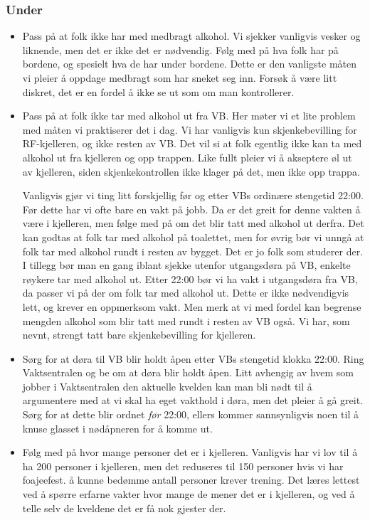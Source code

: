 \documentclass[11pt,norsk,a4paper]{article}
\begin{document}
\subsubsection{Under}
\begin{itemize}
\item Pass på at folk ikke har med medbragt alkohol. Vi sjekker vanligvis vesker og liknende, men det er ikke det er nødvendig. Følg med på hva folk har på bordene, og spesielt hva de har under bordene. Dette er den vanligste måten vi pleier å oppdage medbragt som har sneket seg inn. Forsøk å være litt diskret, det er en fordel å ikke se ut som om man kontrollerer.
\item Pass på at folk ikke tar med alkohol ut fra VB. Her møter vi et lite problem med måten vi praktiserer det i dag. Vi har vanligvis kun skjenkebevilling for RF-kjelleren, og ikke resten av VB. Det vil si at folk egentlig ikke kan ta med alkohol ut fra kjelleren og opp trappen. Like fullt pleier vi å akseptere øl ut av kjelleren, siden skjenkekontrollen ikke klager på det, men ikke opp trappa.

Vanligvis gjør vi ting litt forskjellig før og etter VBs ordinære stengetid 22:00. Før dette har vi ofte bare en vakt på jobb. Da er det greit for denne vakten å være i kjelleren, men følge med på om det blir tatt med alkohol ut derfra. Det kan godtas at folk tar med alkohol på toalettet, men for øvrig bør vi unngå at folk tar med alkohol rundt i resten av bygget. Det er jo folk som studerer der. I tillegg bør man en gang iblant sjekke utenfor utgangsdøra på VB, enkelte røykere tar med alkohol ut. Etter 22:00 bør vi ha vakt i utgangsdøra fra VB, da passer vi på der om folk tar med alkohol ut. Dette er ikke nødvendigvis lett, og krever en oppmerksom vakt. Men merk at vi med fordel kan begrense mengden alkohol som blir tatt med rundt i resten av VB også. Vi har, som nevnt, strengt tatt bare skjenkebevilling for kjelleren.
\item Sørg for at døra til VB blir holdt åpen etter VBs stengetid klokka 22:00. Ring Vaktsentralen og be om at døra blir holdt åpen. Litt avhengig av hvem som jobber i Vaktsentralen den aktuelle kvelden  kan man bli nødt til å argumentere med at vi skal ha eget vakthold i døra, men det pleier å gå greit. Sørg for at dette blir ordnet \textit{før} 22:00, ellers kommer sannsynligvis noen til å knuse glasset i nødåpneren for å komme ut.
\item Følg med på hvor mange personer det er i kjelleren. Vanligvis har vi lov til å ha 200 personer i kjelleren, men det reduseres til 150 personer hvis vi har foajeefest. å kunne bedømme antall personer krever trening. Det læres lettest ved å spørre erfarne vakter hvor mange de mener det er i kjelleren, og ved å telle selv de kveldene det er få nok gjester der.


\end{itemize}
\end{document}
